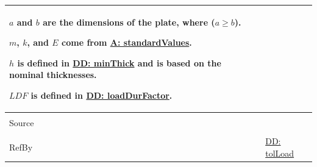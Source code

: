 \documentclass[12pt]{article}
\begin{document}
\begin{minipage}{\textwidth}
\begin{tabular}{>{\raggedright}p{}>{\raggedright\arraybackslash}p{}}
        $a$ and $b$ are the dimensions of the plate, where ($a\geq{}b$).
        
        $m$, $k$, and $E$ come from \hyperref[assumpSV]{A: standardValues}.
        
        $h$ is defined in \hyperref[DD:minThick]{DD: minThick} and is based on the nominal thicknesses.
        
        $LDF$ is defined in \hyperref[DD:loadDurFactor]{DD: loadDurFactor}.
        
\\ \midrule \\
Source & \cite{astm2009}
         
\\ \midrule \\
RefBy & \hyperref[DD:tolLoad]{DD: tolLoad}
        
\\ \bottomrule
\end{tabular}
\end{minipage}
\end{document}
